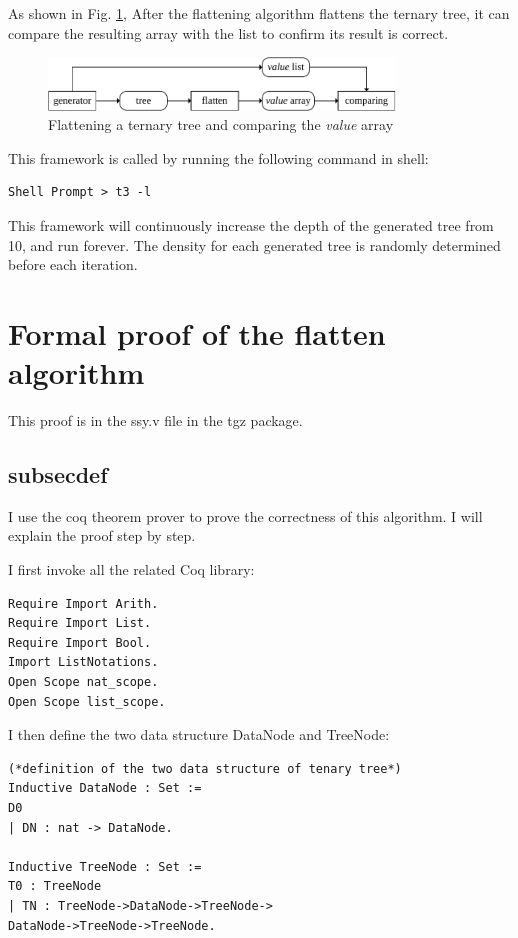 \documentclass[runningheads,a4paper]{llncs}
\begin{document}
As shown in Fig. \ref{fig_closeloop2},
After the flattening algorithm flattens the ternary tree,
it can compare the resulting array with the list to confirm its result is correct.

\begin{figure}
\centering
\includegraphics[width=9.2cm]{fig_closeloop2}
\caption{Flattening a ternary tree and comparing the \emph{value} array}
\label{fig_closeloop2}
\end{figure}


This framework is called by running the following command in shell:

\begin{lstlisting}
Shell Prompt > t3 -l
\end{lstlisting}


This framework will continuously increase the depth of the generated tree from 10,
and run forever.
The density for each generated tree is randomly determined before each iteration.



\section{Formal proof of the flatten algorithm}\label{sec_proof}

This proof is in the ssy.v file in the tgz package.
\subsection{subsecdef}
I use the coq theorem prover\cite{coq} to prove the correctness of this algorithm.
I will explain the proof step by step.

I first invoke all the related Coq library:

\begin{lstlisting}
Require Import Arith.
Require Import List.
Require Import Bool.
Import ListNotations.
Open Scope nat_scope.
Open Scope list_scope.
\end{lstlisting}

I then define the two data structure DataNode and TreeNode:

\begin{lstlisting}
(*definition of the two data structure of tenary tree*)
Inductive DataNode : Set :=
D0
| DN : nat -> DataNode.

Inductive TreeNode : Set :=
T0 : TreeNode
| TN : TreeNode->DataNode->TreeNode->
DataNode->TreeNode->TreeNode.
\end{lstlisting}
\end{document}
